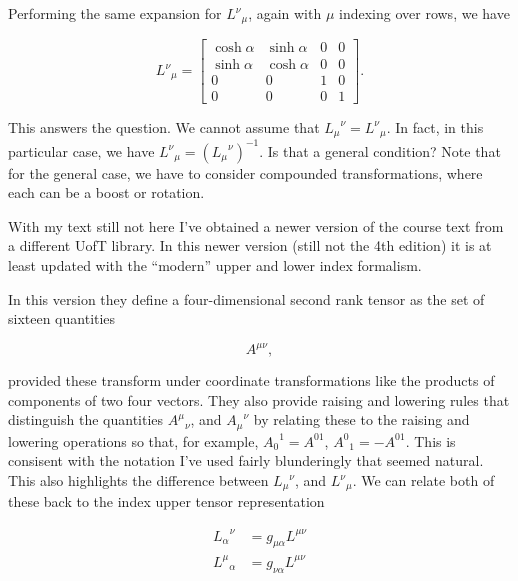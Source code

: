 Performing the same expansion for ${L^\nu}_\mu$, again with $\mu$ indexing over rows, we have

\begin{equation}\label{eqn:antisymmetricTensorTx:470}
{L^\nu}_\mu =
\begin{bmatrix}
\cosh \alpha & \sinh \alpha & 0 & 0 \\
\sinh \alpha & \cosh \alpha & 0 & 0 \\
0 & 0 & 1 & 0 \\
0 & 0 & 0 & 1
\end{bmatrix}.
\end{equation}

This answers the question.  We cannot assume that ${L_\mu}^\nu = {L^\nu}_\mu$.  In fact, in this particular case, we have ${L^\nu}_\mu = ({L_\mu}^\nu)^{-1}$.  Is that a general condition?  Note that for the general case, we have to consider compounded transformations, where each can be a boost or rotation.

With my text still not here I've obtained a newer version of the course text from a different UofT library.  In this newer version \cite{landau1971classical} (still not the 4th edition) it is at least updated with the ``modern'' upper and lower index formalism.

In this version they define a four-dimensional second rank tensor as the set of sixteen quantities

\begin{equation}\label{eqn:antisymmetricTensorTx:471}
A^{\mu\nu},
\end{equation}

provided these transform under coordinate transformations like the products of components of two four vectors.  They also provide raising and lowering rules that distinguish the quantities ${A^{\mu}}_\nu$, and ${A_{\mu}}^\nu$ by relating these to the raising and lowering operations so that, for example, ${A_0}^1 = A^{01}$, ${A^0}_1 = -A^{01}$.  This is consisent with the notation I've used fairly blunderingly that seemed natural.  This also highlights the difference between ${L_\mu}^\nu$, and ${L^\nu}_\mu$.  We can relate both of these back to the index upper tensor representation

\begin{align}\label{eqn:antisymmetricTensorTx:472}
{L_\alpha}^\nu &= g_{\mu \alpha} L^{\mu \nu} \\
{L^\mu}_\alpha &= g_{\nu \alpha} L^{\mu \nu}
\end{align}

